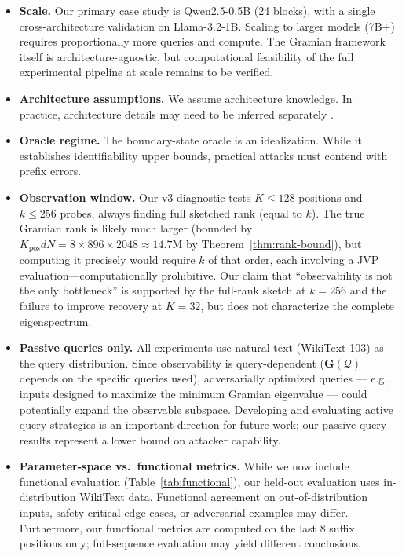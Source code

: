 \documentclass{article}
\newcommand{\cQ}{\mathcal{Q}}
\newcommand{\bG}{\mathbf{G}}
\begin{document}
\begin{itemize}
    \item \textbf{Scale.} Our primary case study is Qwen2.5-0.5B (24 blocks), with a single cross-architecture validation on Llama-3.2-1B. Scaling to larger models (7B+) requires proportionally more queries and compute. The Gramian framework itself is architecture-agnostic, but computational feasibility of the full experimental pipeline at scale remains to be verified.
    \item \textbf{Architecture assumptions.} We assume architecture knowledge. In practice, architecture details may need to be inferred separately \citep{oh2019towards}.
    \item \textbf{Oracle regime.} The boundary-state oracle is an idealization. While it establishes identifiability upper bounds, practical attacks must contend with prefix errors.
    \item \textbf{Observation window.} Our v3 diagnostic tests $K \leq 128$ positions and $k \leq 256$ probes, always finding full sketched rank (equal to $k$).  The true Gramian rank is likely much larger (bounded by $K_\text{pos} d N = 8 \times 896 \times 2048 \approx 14.7\text{M}$ by Theorem~\ref{thm:rank-bound}), but computing it precisely would require $k$ of that order, each involving a JVP evaluation---computationally prohibitive.  Our claim that ``observability is not the only bottleneck'' is supported by the full-rank sketch at $k{=}256$ and the failure to improve recovery at $K{=}32$, but does not characterize the complete eigenspectrum.
    \item \textbf{Passive queries only.}  All experiments use natural text (WikiText-103) as the query distribution.  Since observability is query-dependent ($\bG(\cQ)$ depends on the specific queries used), adversarially optimized queries --- e.g., inputs designed to maximize the minimum Gramian eigenvalue --- could potentially expand the observable subspace.  Developing and evaluating active query strategies is an important direction for future work; our passive-query results represent a lower bound on attacker capability.
    \item \textbf{Parameter-space vs.\ functional metrics.}  While we now include functional evaluation (Table~\ref{tab:functional}), our held-out evaluation uses in-distribution WikiText data.  Functional agreement on out-of-distribution inputs, safety-critical edge cases, or adversarial examples may differ.  Furthermore, our functional metrics are computed on the last 8 suffix positions only; full-sequence evaluation may yield different conclusions.

\end{itemize}
\end{document}
